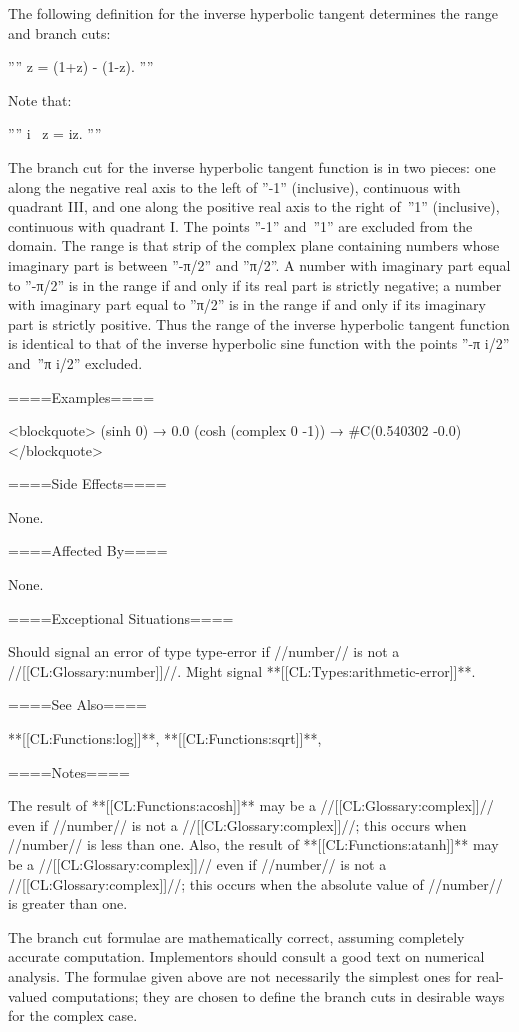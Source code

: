 The following definition for the inverse hyperbolic tangent determines the range and branch cuts:

''''  z = {{ (1+z) -  (1-z)}}. ''''

Note that:

'''' i\  z =  iz. ''''

The branch cut for the inverse hyperbolic tangent function is in two pieces: one along the negative real axis to the left of ''-1'' (inclusive), continuous with quadrant III, and one along the positive real axis to the right of~''1'' (inclusive), continuous with quadrant I. The points ''-1'' and~''1'' are excluded from the domain. The range is that strip of the complex plane containing numbers whose imaginary part is between ''-π/2'' and ''π/2''. A number with imaginary part equal to ''-π/2'' is in the range if and only if its real part is strictly negative; a number with imaginary part equal to ''π/2'' is in the range if and only if its imaginary part is strictly positive. Thus the range of the inverse hyperbolic tangent function is identical to that of the inverse hyperbolic sine function with the points ''-π i/2'' and~''π i/2'' excluded.

====Examples====

<blockquote> (sinh 0) → 0.0 (cosh (complex 0 -1)) → #C(0.540302 -0.0) </blockquote>

====Side Effects====

None.

====Affected By====

None.

====Exceptional Situations====

Should signal an error of type type-error if //number// is not a //[[CL:Glossary:number]]//. Might signal **[[CL:Types:arithmetic-error]]**.

====See Also====

**[[CL:Functions:log]]**, **[[CL:Functions:sqrt]]**, {\secref\FloatSubstitutability}

====Notes====

The result of **[[CL:Functions:acosh]]** may be a //[[CL:Glossary:complex]]// even if //number// is not a //[[CL:Glossary:complex]]//; this occurs when //number// is less than one. Also, the result of **[[CL:Functions:atanh]]** may be a //[[CL:Glossary:complex]]// even if //number// is not a //[[CL:Glossary:complex]]//; this occurs when the absolute value of //number// is greater than one.

The branch cut formulae are mathematically correct, assuming completely accurate computation. Implementors should consult a good text on numerical analysis. The formulae given above are not necessarily the simplest ones for real-valued computations; they are chosen to define the branch cuts in desirable ways for the complex case.

  
